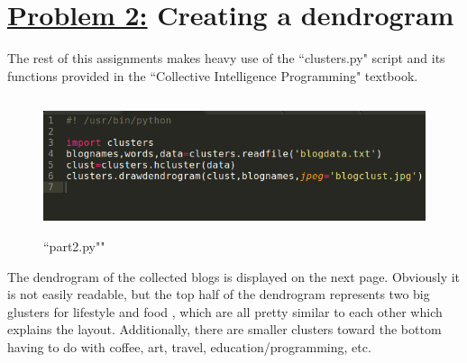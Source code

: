 \documentclass{article}
\begin{document}
\section*{{\underline{\huge {Problem 2:}} Creating a dendrogram  }}
The rest of this assignments makes heavy  use of the ``clusters.py" script and its functions provided in the ``Collective Intelligence Programming" textbook.

\begin{figure}[H]
 \centering
 	\includegraphics[height=4cm]{p2.png}
  \caption{``part2.py""}
\end{figure}

The dendrogram of the collected blogs is displayed on the next page. Obviously it is not easily readable, but the top half of the dendrogram represents two big glusters for lifestyle and food , which are all pretty similar to each other which explains the layout. Additionally, there are smaller clusters toward the bottom having to do with coffee, art, travel, education/programming, etc.
\end{document}
